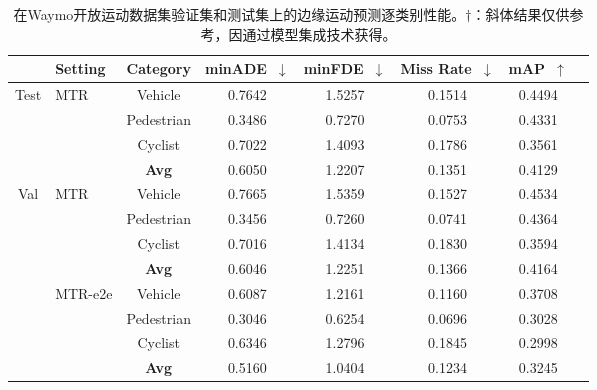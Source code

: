 \documentclass{article}
\begin{document}
    \begin{table}[h]
		\centering\small
		\setlength\tabcolsep{9pt}
		\caption{在Waymo开放运动数据集验证集和测试集上的边缘运动预测逐类别性能。$\dagger$：斜体结果仅供参考，因通过模型集成技术获得。}
		\vspace{1mm}
			\begin{tabular}{c|l|c||ccccc}
				\hline
				\rowcolor{mygray} & Setting & Category & minADE~$\downarrow$ & minFDE~$\downarrow$ & Miss Rate~$\downarrow$ & { mAP}~$\uparrow$ \\
				\hline
				\multirow{4}{*}{Test}
				& \multirow{4}{*}{MTR} & Vehicle & 0.7642 & 1.5257	& 0.1514 & 0.4494	 \\
				& & Pedestrian & 0.3486 & 0.7270 & 0.0753 & 0.4331\\
				& & Cyclist & 0.7022 & 1.4093 & 0.1786 & 0.3561	 \\
				& & {\bf Avg} & 0.6050 & 1.2207 & 0.1351 & 0.4129	 \\
				\cline{1-7}
				\multirow{12}{*}{Val}
				& \multirow{4}{*}{MTR} & Vehicle & 0.7665 & 1.5359 & 0.1527	 & 0.4534	\\
				& & Pedestrian & 0.3456 & 0.7260 & 0.0741 & 0.4364	\\
				& & Cyclist & 0.7016 & 1.4134 & 0.1830 & 0.3594\\
				& & {\bf Avg} & 0.6046 & 1.2251 & 0.1366 & 0.4164\\
				\cline{2-7}
				& \multirow{4}{*}{MTR-e2e} & Vehicle & 	0.6087 & 1.2161 & 0.1160 & 0.3708 \\
				& & Pedestrian & 0.3046 &	0.6254	& 0.0696 & 0.3028	\\
				& & Cyclist & 0.6346 & 1.2796 & 0.1845 & 0.2998	 \\
				& & {\bf Avg} & 0.5160 & 1.0404 & 0.1234 & 0.3245\\
				\cline{2-7}
				\hline
		\end{tabular}
		\vspace{-3mm}
		\label{tab:wod_test_perclass}
	\end{table}
    
\end{document}
